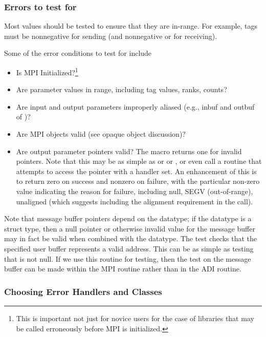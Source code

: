 \documentclass{article}
\begin{document}
\subsubsection{Errors to test for}
Most values should be tested to ensure that they are in-range.  For example,
tags must be nonnegative for sending (and nonnegative or
 for receiving). 

Some of the error conditions to test for include
\begin{itemize}
\item Is MPI Initialized?\footnote{This is important not just for
novice users for the case of libraries that may be called erroneously
before MPI is initialized.}
\item Are parameter values in range, including tag values, ranks, counts?
\item Are input and output parameters improperly aliased (e.g., inbuf and
  outbuf of   )?
\item Are MPI objects valid (see opaque object discussion)?
\item Are output parameter pointers valid?  The macro
   returns one for invalid pointers.
  Note that this may be as simple as  or
   or , or
  even call a routine that attempts to access the pointer with a
   handler set.  An enhancement of this is to return
zero on success and nonzero on failure, with the particular non-zero
value indicating the reason for failure, including null, SEGV
(out-of-range), unaligned (which suggests including the alignment
requirement in the call).
\end{itemize}
Note that message buffer pointers depend on the datatype; if the datatype is a
struct type, then a null pointer or otherwise invalid value for the message
buffer may in fact be valid when combined with the datatype.
The test  checks that the
specified user buffer represents a valid address.  This can be as simple as
testing that  is not null.  If we use
this routine for testing, then the test on the message buffer can be made
within the MPI routine rather than in the ADI routine.

\subsubsection{Choosing Error Handlers and Classes}
\label{sec:chosing-errhandler}
\end{document}
